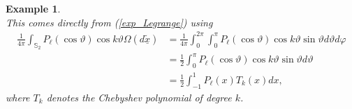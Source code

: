 \documentclass[preprint,11pt,a4paper]{elsarticle}
\newtheorem{example}[theorem]{Example}
\begin{document}
\begin{example}
\begin{equation*}
\end{equation*}
This comes directly from (\ref{exp_Legrange}) using 
\begin{align*}
\frac{1}{4\pi}\int_{\mathbb{S}_{2}}P_{\ell}\left( \cos\vartheta\right) \cos
k\vartheta\Omega\left( d\underline{\widetilde{x}}\right) & =\frac{1}{4\pi }%
\int_{0}^{2\pi}\int_{0}^{\pi}P_{\ell}\left( \cos\vartheta\right) \cos
k\vartheta\sin\vartheta d\vartheta d\varphi \\
& =\frac{1}{2}\int_{0}^{\pi}P_{\ell}\left( \cos\vartheta\right) \cos
k\vartheta\sin\vartheta d\vartheta \\
& =\frac{1}{2}\int_{-1}^{1}P_{\ell}\left( x\right) T_{k}\left( x\right) dx,
\end{align*}
where $T_{k}$ denotes the Chebyshev polynomial of degree $k$.
\end{example}
\end{document}
